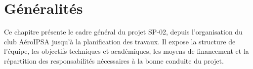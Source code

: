 \section{Généralités}
\label{sec:generalites}

Ce chapitre présente le cadre général du projet SP-02, depuis l’organisation du club AéroIPSA jusqu’à la planification des
travaux. Il expose la structure de l’équipe, les objectifs techniques et académiques, les moyens de financement et la
répartition des responsabilités nécessaires à la bonne conduite du projet.\\








\newpage